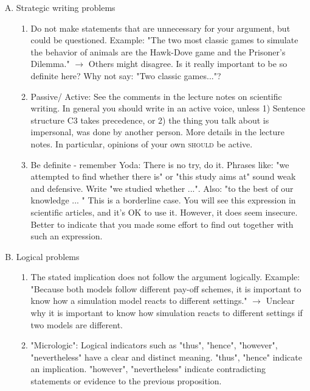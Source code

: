 \documentclass{tufte-book}
\begin{document}
\begin{enumerate}[(A)]


\item Strategic writing problems
\begin{enumerate}
	\item Do not make statements that are unnecessary for your argument, but could be questioned. 
	Example: "The two most classic games to simulate the behavior of animals are the Hawk-Dove game and the Prisoner's Dilemma." $\rightarrow$ Others might disagree. Is it really important to be so definite here? Why not say: "Two classic games..."?
	\item Passive/ Active: See the comments in the lecture notes on scientific writing. In general you should write in an active voice, unless  1) Sentence structure C3 takes precedence, or 2) the thing you talk about is impersonal, was done by another person. More details in the lecture notes. In particular, opinions of your own \textsc{should} be active.
	\item Be definite - remember Yoda: There is no try, do it. Phrases like: "we attempted to find whether there is" or "this study aims at" sound weak and defensive. Write "we studied whether ...". Also: "to the best of our knowledge ... " This is a borderline case. You will see this expression in scientific articles, and it's OK to use it. However, it does seem insecure. Better to indicate that you made some effort to find out together with such an expression. 	
	
 

\end{enumerate}

\item Logical problems
\begin{enumerate}
	\item The stated implication does not follow the argument logically. Example: "Because both models follow different pay-off schemes, it is important to know how a simulation model reacts to different settings." $\rightarrow$ Unclear why it is important to know how simulation reacts to different settings if two models are different.
	\item "Micrologic": Logical indicators such as "thus", "hence", "however", "nevertheless" have a clear and distinct meaning. "thus", "hence" indicate an implication. "however", "nevertheless" indicate contradicting statements or evidence to the previous proposition.
\end{enumerate}



\end{enumerate}
\end{document}
